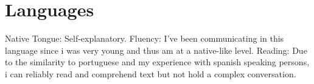\section{Languages}
{Native Tongue: Self-explanatory.}
{Fluency: I've been communicating in this language since i was very young and thus am at a native-like level.}
{Reading: Due to the similarity to portuguese and my experience with spanish speaking persons, i can reliably read and comprehend text but not hold a complex conversation.}

